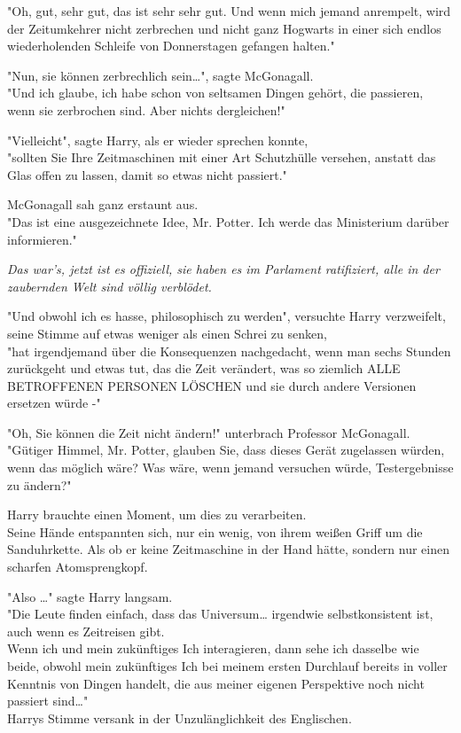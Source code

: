 {"Oh, gut, sehr gut, das ist sehr sehr gut. Und wenn mich jemand anrempelt, wird der Zeitumkehrer nicht zerbrechen und nicht ganz Hogwarts in einer sich endlos wiederholenden Schleife von Donnerstagen gefangen halten."

"Nun, sie können zerbrechlich sein…", sagte McGonagall.\\ "Und ich glaube, ich habe schon von seltsamen Dingen gehört, die passieren, wenn sie zerbrochen sind. Aber nichts dergleichen!"

"Vielleicht", sagte Harry, als er wieder sprechen konnte,\\ "sollten Sie Ihre Zeitmaschinen mit einer Art Schutzhülle versehen, anstatt das Glas offen zu lassen, damit so etwas nicht passiert."

McGonagall sah ganz erstaunt aus.\\ "Das ist eine ausgezeichnete Idee, Mr. Potter. Ich werde das Ministerium darüber informieren."

\emph{Das war's, jetzt ist es offiziell, sie haben es im Parlament ratifiziert, alle in der zaubernden Welt sind völlig verblödet.}

"Und obwohl ich es hasse, philosophisch zu werden", versuchte Harry verzweifelt, seine Stimme auf etwas weniger als einen Schrei zu senken,\\ "hat irgendjemand über die Konsequenzen nachgedacht, wenn man sechs Stunden zurückgeht und etwas tut, das die Zeit verändert, was so ziemlich ALLE BETROFFENEN PERSONEN LÖSCHEN und sie durch andere Versionen ersetzen würde -"

"Oh, Sie können die Zeit nicht ändern!" unterbrach Professor McGonagall.\\ "Gütiger Himmel, Mr. Potter, glauben Sie, dass dieses Gerät zugelassen würden, wenn das möglich wäre? Was wäre, wenn jemand versuchen würde, Testergebnisse zu ändern?"

Harry brauchte einen Moment, um dies zu verarbeiten.\\ Seine Hände entspannten sich, nur ein wenig, von ihrem weißen Griff um die Sanduhrkette. Als ob er keine Zeitmaschine in der Hand hätte, sondern nur einen scharfen Atomsprengkopf.

"Also …" sagte Harry langsam.\\ "Die Leute finden einfach, dass das Universum… irgendwie selbstkonsistent ist, auch wenn es Zeitreisen gibt.\\ Wenn ich und mein zukünftiges Ich interagieren, dann sehe ich dasselbe wie beide, obwohl mein zukünftiges Ich bei meinem ersten Durchlauf bereits in voller Kenntnis von Dingen handelt, die aus meiner eigenen Perspektive noch nicht passiert sind…"\\ Harrys Stimme versank in der Unzulänglichkeit des Englischen.

}
